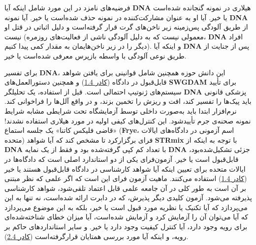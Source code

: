 فرضیه‌های نامزد در این مورد شامل اینکه آیا \textenglish{\textbf{DNA}} هیلاری در نمونه گنجانده شده‌است یا خیر.
آیا او به عنوان مشارکت‌کننده در نمونه حذف شده‌است یا خیر.
آیا نمونه \textenglish{\textbf{DNA}} از طریق آلودگی پس‌زمینه زیر ناخن‌های گرت قرار گرفته‌است و دلیل اثباتی در قتل او نیست (معمولی نیست که به دلیل آلودگی ناشی از فعالیت‌های روزمره، \textenglish{\textbf{DNA}} افراد دیگر را در زیر ناخن‌هایمان به مقدار کمی پیدا کنیم).
و اینکه آیا \textenglish{\textbf{DNA}} پس از جنایت از طریق نوعی آلودگی با واسطه بازپرس معرفی شده‌است یا خیر.

برای تفسیر \textenglish{\textbf{DNA}}، این دانش حوزه همچنین شامل قوانینی برای یافتن شواهد قابل‌قبول در دادگاه (\hyperref[sec:کادر 1.4]{کادر 1.4}) و همچنین دستورالعمل‌های \textenglish{\textbf{SWGDAM}} برای تأیید سیستم‌های ژنوتیپ احتمالی است.
قبل از استفاده، یک تحلیلگر \textenglish{\textbf{DNA}} پزشکی قانونی باید پیک‌ها را تفسیر کند، افت و ریزش را تخمین بزند، و در واقع آلل‌ها را فراخوانی کند.
نرم‌افزار ابتدا باید به‌صورت داخلی توسط آزمایشگاه تحت شرایطی مشابه شرایط نمونه صحنه‌ی جرم تأیید‌شود.
این کنترل‌های کیفی اولیه در مورد هیلاری استفاده نشدند!
«قاضی فلیکس کاتنا» یک جلسه استماع (\textenglish{\textbf{Frye}}، اسم آزمونی در دادگاه‌های ایالات متحده) فرای برگزار‌کرد تا مشخص کند که آیا شواهد \textenglish{\textbf{STRmix}} با توجه به اینکه از \textenglish{\textbf{DNA}} با تعداد کم کپی گرفته‌شده بود و فقط از یک نمایه \textenglish{\textbf{DNA}} جزئی تشکیل‌شده‌بود، قابل‌قبول است یا خیر.
آزمون‌فرای یکی از دو استاندارد اصلی است که دادگاه‌ها در ایالات متحده برای تعیین اینکه آیا شواهد کارشناسی در دادگاه قابل‌قبول هستند یا خیر (\hyperref[sec:کادر 1.4]{کادر 1.4}) استفاده می‌کنند.
ماهیت آزمون فرای این است که اگر علمی که نظر مبتنی بر آن است به طور کلی در آن جامعه علمی قابل اعتماد تلقی‌شود، شواهد کارشناسی پذیرفته می‌شود.
آزمون کلیدی دیگر پذیرش، که در دابرت ارائه شده‌است، نه تنها به این می‌پردازد که آیا تکنیک یا نظریه مورد قبول است یا خیر، بلکه به این موضوع می‌پردازد که آیا می‌توان آن را آزمایش کرد و آزمایش شده‌است، آیا میزان خطای شناخته‌شده‌ای برای رویه وجود دارد، آیا کنترل کیفیت وجود دارد یا خیر.
و سایر استانداردهای حاکم بر رویه، و اینکه آیا مورد بررسی همتایان قرار‌گرفته‌است (\hyperref[sec:کادر 2.4]{کادر 2.4}).





